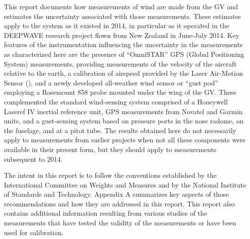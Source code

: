 \documentclass[12pt,twoside,english]{article}\usepackage[]{graphicx}\usepackage[]{color}
\let\OrgIndex\index
\renewcommand*{\index}[1]{\OrgIndex{#1}}
\begin{document}
This report documents how measurements of wind are made from the GV and estimates the uncertainty associated with those measurements. These estimates apply to the system as it existed in 2014, in particular as it operated in the DEEPWAVE research project flown from New Zealand in June-July 2014. Key features of the instrumentation influencing the uncertainty in the measurements as characterized here are the presence of ``OmniSTAR'' GPS (Global Positioning System) measurements, providing measurements of the velocity of the aircraft relative to the earth, a calibration of airspeed provided by the Laser Air-Motion Sensor (\citet{CooperEtAl2014}), and a newly developed all-weather wind sensor or ``gust pod'' employing a Rosemount 858 probe mounted under the wing of the GV. These complemented the standard wind-sensing system comprised of a Honeywell Laseref IV inertial reference unit, GPS measurements from Novatel and Garmin units, and a gust-sensing system based on pressure ports in the nose radome, on the fuselage, and at a pitot tube. The results obtained here do not necessarily apply to measurements from earlier projects when not all these components were available in their present form, but they should apply to measurements subsequent to 2014. 

The intent in this report is to follow the conventions established by the International Committee on Weights and Measures and by the National Institute of Standards and Technology. Appendix A summarizes key aspects of those recommendations and how they are addressed in this report. This report also contains additional information resulting from various studies of the measurements that have tested the validity of the measurements or have been used for calibration. 
\end{document}

